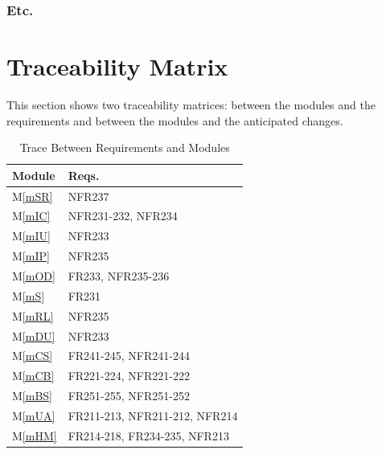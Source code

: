 \documentclass[12pt, titlepage]{article}
\newcommand{\mref}[1]{M\ref{#1}}
\begin{document}
\subsubsection{Etc.}

\section{Traceability Matrix} \label{SecTM}

This section shows two traceability matrices: between the modules and the
requirements and between the modules and the anticipated changes.

\begin{table}[H]
\centering
\begin{tabular}{p{} p{}}
\toprule
\textbf{Module} & \textbf{Reqs.}\\
\midrule
\mref{mSR} & NFR237\\
\mref{mIC} & NFR231-232, NFR234\\
\mref{mIU} & NFR233\\
\mref{mIP} & NFR235\\
\mref{mOD} & FR233, NFR235-236\\
\mref{mS} & FR231\\
\mref{mRL} & NFR235\\
\mref{mDU} & NFR233\\
\mref{mCS} & FR241-245, NFR241-244\\
\mref{mCB} & FR221-224, NFR221-222\\
\mref{mBS} & FR251-255, NFR251-252\\
\mref{mUA} & FR211-213, NFR211-212, NFR214 \\
\mref{mHM} & FR214-218, FR234-235, NFR213 \\

\bottomrule
\end{tabular}
\caption{Trace Between Requirements and Modules}
\label{TblRT}
\end{table}
\end{document}
